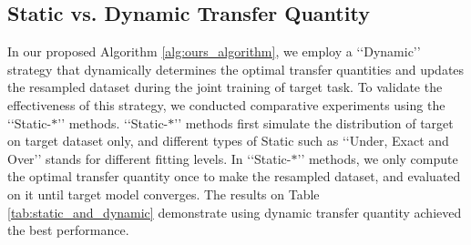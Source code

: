 \subsection{Static vs. Dynamic Transfer Quantity} 
In our proposed Algorithm \ref{alg:ours_algorithm}, we employ a ‘‘Dynamic’’ strategy that dynamically determines the optimal transfer quantities and updates the resampled dataset during the joint training of target task. To validate the effectiveness of this strategy, 
we conducted comparative experiments using the ‘‘Static-\(*\)’’ methods. ‘‘Static-$*$’’ methods first simulate the distribution of target on target dataset only, and different types of Static such as ‘‘Under, Exact and Over’’ stands for different fitting levels. In ‘‘Static-\(*\)’’ methods, we only compute the optimal transfer quantity once to make the resampled dataset, and evaluated on it until target model converges. The results on Table \ref{tab:static_and_dynamic} demonstrate \ourmethod{} using dynamic transfer quantity achieved the best performance.
\begin{table}[htbp]
\centering
\caption{Static vs. Dynamic Transfer Quantity in \ourmethod{} on Office-Home. Arrows will transfer from the rest tasks.}
\label{tab:static_and_dynamic}
\vspace{-3mm} 
\end{table}

